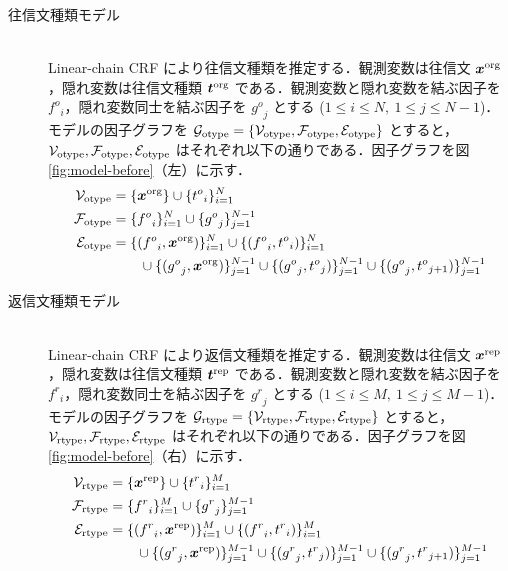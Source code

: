 \documentclass[japanese]{jnlp_1.4}
\begin{document}
\begin{description}
\item[往信文種類モデル] \mbox{} \\
  Linear-chain CRF により往信文種類を推定する．観測変数は往信文 $\bm{x}^{\rm org}$，隠れ変数は往信文種類 $\bm{t}^{\rm org}$ である．観測変数と隠れ変数を結ぶ因子を ${f^o}_i$，隠れ変数同士を結ぶ因子を ${g^o}_j$ とする ($1 \leq i \leq N,~ 1 \leq j \leq N-1$)．
  モデルの因子グラフを $\mathcal{G}_{\rm otype} = \{ \mathcal{V}_{\rm otype}, \mathcal{F}_{\rm otype}, \mathcal{E}_{\rm otype} \}$ とすると，$\mathcal{V}_{\rm otype}, \mathcal{F}_{\rm otype}, \mathcal{E}_{\rm otype}$ はそれぞれ以下の通りである．因子グラフを図 \ref{fig:model-before}（左）に示す．
\begin{equation}
 \begin{split}
  \mathcal{V}_{\rm otype} &= \{ \bm{x}^{\rm org}\} \cup \{ {t^o}_i \}_{i=1}^{N}  \\
  \mathcal{F}_{\rm otype} &= \{ {f^o}_i \}_{i=1}^{N} \cup \{ {g^o}_j \}_{j=1}^{N-1}  \\
  \mathcal{E}_{\rm otype} &= \{ ({f^o}_i, \bm{x}^{\rm org}) \}_{i=1}^{N} \cup \{ ({f^o}_i, {t^o}_i) \}_{i=1}^{N} \\
    & \qquad \cup \{ ({g^o}_j, {\bm{x}^{\rm org}}) \}_{j=1}^{N-1} 
	\cup \{ ({g^o}_j, {t^o}_j) \}_{j=1}^{N-1} \cup \{ ({g^o}_j, {t^o}_{j+1}) \}_{j=1}^{N-1}
 \end{split}
\end{equation}
  
\item[返信文種類モデル] \mbox{} \\
  Linear-chain CRF により返信文種類を推定する．観測変数は往信文 $\bm{x}^{\rm rep}$，隠れ変数は往信文種類 $\bm{t}^{\rm rep}$ である．観測変数と隠れ変数を結ぶ因子を ${f^r}_i$，隠れ変数同士を結ぶ因子を ${g^r}_j$ とする ($1 \leq i \leq M,~ 1 \leq j \leq M-1$)．
  モデルの因子グラフを $\mathcal{G}_{\rm rtype} = \{ \mathcal{V}_{\rm rtype}, \mathcal{F}_{\rm rtype}, \mathcal{E}_{\rm rtype} \}$ とすると，$\mathcal{V}_{\rm rtype}, \mathcal{F}_{\rm rtype}, \mathcal{E}_{\rm rtype}$ はそれぞれ以下の通りである．因子グラフを図 \ref{fig:model-before}（右）に示す．
\begin{equation}
 \begin{split}
  \mathcal{V}_{\rm rtype} &= \{ \bm{x}^{\rm rep} \} \cup \{ {t^r}_i \}_{i=1}^{M}  \\
  \mathcal{F}_{\rm rtype} &= \{ {f^r}_i \}_{i=1}^{M} \cup \{ {g^r}_j \}_{j=1}^{M-1}  \\
  \mathcal{E}_{\rm rtype} &= \{ ({f^r}_i, \bm{x}^{\rm rep}) \}_{i=1}^{M} \cup \{ ({f^r}_i, {t^r}_i) \}_{i=1}^{M} \\
     & \qquad \cup \{ ({g^r}_j, {\bm{x}^{\rm rep}}) \}_{j=1}^{M-1} \cup \{ ({g^r}_j, {t^r}_j) \}_{j=1}^{M-1} 
	\cup \{ ({g^r}_j, {t^r}_{j+1}) \}_{j=1}^{M-1}
 \end{split}
\end{equation}


\end{description}
\end{document}
